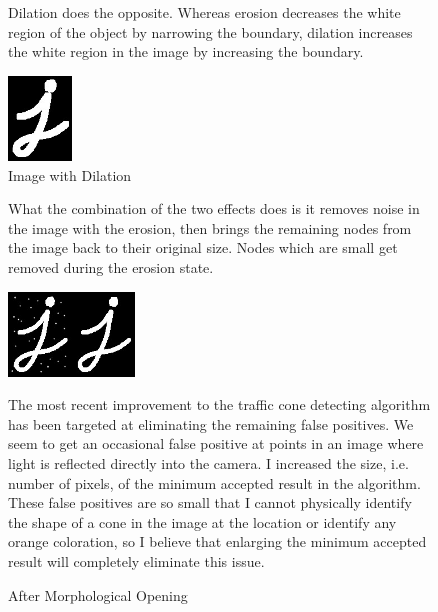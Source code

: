 \documentclass[10pt,letterpaper,onecolumn,draftclsnofoot,journal]{IEEEtran}
\begin{document}
\begin{figure}[h]
	Dilation does the opposite. Whereas erosion decreases the white region of the object by narrowing the boundary, dilation increases the white region in the image by increasing the boundary.
	\vspace{.5cm}

	\begin{center}
	\captionsetup{justification=centering, margin=6.7cm, singlelinecheck=off}
    	\includegraphics[width=0.15\textwidth]{j2}
    	\caption{Image with Dilation}
	\end{center}
	\vspace{.5cm}
\end{figure}
\begin{figure}[h]
	What the combination of the two effects does is it removes noise in the image with the erosion, then brings the remaining nodes from the image 	back to their original size. Nodes which are small get removed during the erosion state.\par
	\vspace{.5cm}
	\captionsetup{justification=raggedleft, margin=0cm, singlelinecheck=off}
	\hfill
    	\includegraphics[width=0.3\textwidth]{j3}
    	\caption{After Morphological Opening}
\vspace{.5cm}
\par
The most recent improvement to the traffic cone detecting algorithm has been targeted at eliminating the remaining false positives. We seem to get an occasional false positive at points in an image where light is reflected directly into the camera. I increased the size, i.e. number of pixels, of the minimum accepted result in the algorithm. These false positives are so small that I cannot physically identify the shape of a cone in the image at the location or identify any orange coloration, so I believe that enlarging the minimum accepted result will completely eliminate this issue.
\end{figure}
\end{document}
